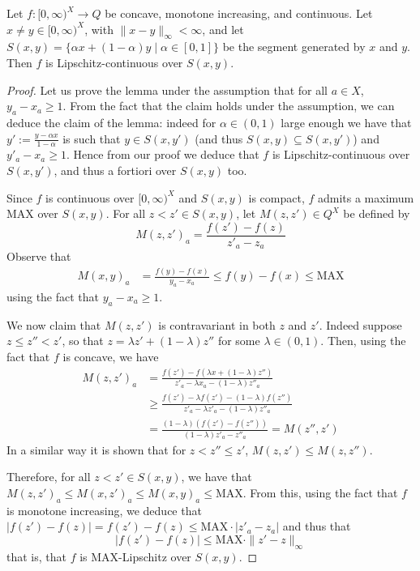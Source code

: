 \begin{lemma}\label{lm:mainLip}
Let $f: [0,\infty)^{X}\to Q$ be concave, monotone increasing, and continuous.  
Let $ x \neq  y  \in [0,\infty)^{X}$, with $\| x - y  \|_{\infty}<\infty$, and let $S( x ,  y  )=\{ \alpha x  + (1-\alpha) y  \mid \alpha \in [0,1]\}$ be the segment generated by $ x $ and $ y  $. 
Then $f$ is Lipschitz-continuous over $S( x ,  y  )$.

\end{lemma}
\begin{proof}
Let us prove the lemma under the assumption that for all $a\in X$, $ y  _{a}- x _{a}\geq 1$. From the fact that the claim holds under the assumption, we can deduce the claim of the lemma:
indeed for $\alpha\in (0,1)$ large enough we have that $ y  ':= \frac{ y  -\alpha x }{1-\alpha}$ is such that $ y  \in S( x ,  y  ')$ (and thus $S( x ,  y  )\subseteq S( x ,  y  ')$) and 
$ y  '_{a}- x _{a}\geq 1$. Hence from our proof we deduce that $f$ is Lipschitz-continuous over $S( x ,  y  ')$, and thus a fortiori over $S( x ,  y  )$ too.


Since $f$ is continuous over $[0,\infty)^{X}$ and $S( x ,  y  )$ is compact, $f$ admits a maximum $\mathrm{MAX}$ over $S( x ,  y  )$.
For all $ z  <  z  '\in S( x ,  y  )$, let $M( z  ,  z  ')\in Q^{X}$ be defined by
$$
M( z  ,  z  ')_{a}= \frac{f( z  ')-f( z  )}{ z  '_{a}- z  _{a}}
$$
Observe that
\begin{align*}
M( x ,  y  )_{a} & = \frac{f( y  )-f( x )}{ y  _{a}- x _{a}} \leq 
f( y  )-f( x ) \leq \mathrm{MAX}
\end{align*}
using the fact that $ y  _{a}- x _{a}\geq 1$. 

We now claim that $M( z  ,  z  ')$ is contravariant in both $ z  $ and $ z  '$. 
Indeed suppose $ z  \leq  z  '' <  z  '$, so that $ z  = \lambda  z  ' +(1-\lambda) z  ''$ for some $\lambda \in (0,1)$. Then, using the fact that $f$ is concave, we have 
\begin{align*}
M( z  ,  z  ')_{a}&=\frac{f( z  ')-f(\lambda  x  +(1-\lambda) z  '')}{ z  '_{a}-\lambda  x _{a} -(1-\lambda) z  ''_{a}} \\
&
\geq 
\frac{f( z  ')-\lambda f( z  ') -(1-\lambda)f( z  '')}{ z  '_{a}-\lambda  z  '_{a} -(1-\lambda) z  ''_{a}} \\
&
= 
\frac{(1-\lambda)(f( z  ')-f( z  ''))}{(1-\lambda ) z  '_{a}- z  ''_{a}} =M( z  '',  z  ')
\end{align*}
In a similar way it is shown that for $ z   <  z  ''\leq  z  '$, $M( z  , z  ')\leq M( z  ,  z  '')$. 

Therefore, for all $ z   <  z  '\in S( x ,  y  )$, we have that $M( z  ,  z  ')_{a} \leq M( x ,  z  ')_{a} \leq M( x ,  y  )_{a} \leq \mathrm{MAX}$. 
From this, using the fact that $f$ is monotone increasing, we deduce that 
$|f( z  ')-f( z  )|=f( z  ')-f( z  ) \leq \mathrm{MAX}\cdot | z  '_{a}- z  _{a}|
$ and thus that 
$$|f( z  ')-f( z  )|\leq \mathrm{MAX}\cdot \| z  '- z  \|_{\infty}$$
that is, that $f$ is $\mathrm{MAX}$-Lipschitz over $S( x ,  y  )$. 
\end{proof}

